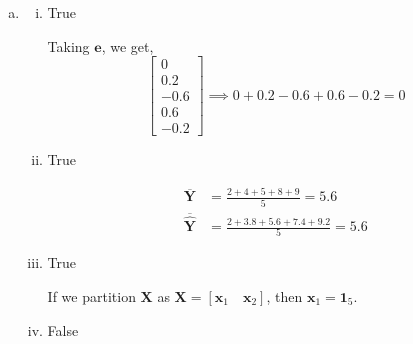 \documentclass[12pt,letterpaper, onecolumn]{exam}
\begin{document}
\begin{questions}
\begin{solution}
\begin{enumerate}[a.)]
        \item 
        \begin{enumerate}[i.)]
            \item True

            Taking $\textbf{e}$, we get,
            \begin{equation*}
                \left[\begin{array}{c}
                0  \\
                0.2  \\
                -0.6  \\
                0.6  \\
                -0.2 
            \end{array} \right] \implies 0 + 0.2 -0.6 + 0.6 - 0.2 = 0
            \end{equation*}
            
            \item True

            \begin{align*}
                \overline{\textbf{Y}} & = \frac{2 + 4 + 5 +8 + 9}{5} = 5.6 \\
                \overline{\hat{\textbf{Y}}} & = \frac{2 + 3.8 + 5.6 + 7.4 + 9.2}{5} = 5.6
            \end{align*}

            \item True

            If we partition $\textbf{X}$ as $\textbf{X}=[ \textbf{x}_1 \quad \textbf{x}_2]$, then $\textbf{x}_1 = \textbf{1}_5$.

            \item False


\end{enumerate}
\end{enumerate}
\end{solution}
\end{questions}
\end{document}
